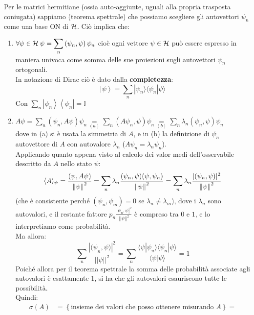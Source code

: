 Per le matrici hermitiane (ossia auto-aggiunte, uguali alla propria trasposta coniugata) sappiamo (teorema spettrale) che possiamo scegliere gli autovettori $\psi_n$ come una base ON di $\mathcal{H}$. Ciò implica che:
\begin{enumerate}
    \item $\displaystyle \forall \psi \in \mathcal{H} \> \psi = \sum_{n}{\left(\psi_n, \psi\right)\psi_n}$
    cioè ogni vettore $\psi \in \mathcal{H}$ può essere espresso in maniera univoca come somma delle sue proiezioni sugli autovettori $\psi_n$ ortogonali.\\
    In notazione di Dirac ciò è dato dalla \textbf{completezza}:
    \[
	\left|\psi\right\rangle=\sum_{n}{|\psi_n\rangle \langle\psi_n|\psi\rangle }
	\]
	Con $\sum_{n}{\left|\psi_n\right\rangle\left\langle\psi_n\right|=\mathbb{I}}$
	\item $\displaystyle A\psi = \sum_{n}{\left(\psi_n, A\psi\right)\psi_n \underset{(a)}{=} \sum_{n}{\left(A\psi_n, \psi\right)\psi_n \underset{(b)}{=}\sum_{n}{\lambda_n\left(\psi_n, \psi\right)\psi_n}}}$\\
	dove in (a) si è usata la simmetria di $A$, e in (b) la definizione di $\psi_n$ autovettore di $A$ con autovalore $\lambda_n$ ($A\psi_n = \lambda_n \psi_n$).\\
	Applicando quanto appena visto al calcolo dei valor medi dell'osservabile descritto da $A$ nello stato $\psi$:
	\[
	\langle A \rangle_\psi = \frac{(\psi,A\psi)}{\left\lVert\psi\right\rVert^2} = \sum_n \lambda_n \frac{(\psi_n, \psi)(\psi, \psi_n)}{\left\lVert\psi\right\rVert^2} = \sum_n \lambda_n \frac{|(\psi_n, \psi)|^2}{\left\lVert\psi\right\rVert^2}
	\]
	(che è consistente perché $\left(\psi_n, \psi_m\right)=0$ se $\lambda_n\neq \lambda_m$), dove i $\lambda_n$ sono autovalori, e il restante fattore $\displaystyle p_n \frac{\left|\psi_n,\psi\right|^2}{\left|\left|\psi\right|\right|^2}$ è compreso tra $0$ e $1$, e lo interpretiamo come probabilità.\\
	Ma allora:
	\[
	\sum_{n}{\frac{\left|{(\psi}_n, \psi)\right|^2}{\left|\left|\psi\right|\right|^2}=\sum_{n}\frac{\langle\psi|\psi_n\rangle \langle\psi_n|\psi\rangle }{\langle\psi|\psi\rangle }=1 }
	\]
	Poiché allora per il teorema spettrale la somma delle probabilità associate agli autovalori è esattamente $1$, si ha che gli autovalori esauriscono tutte le possibilità.\\
	Quindi:
	\begin{align*}
	    \sigma \left(A\right)&=\left\{\text {insieme dei valori che posso ottenere misurando } A\right\}= \\

\end{align*}
\end{enumerate}
